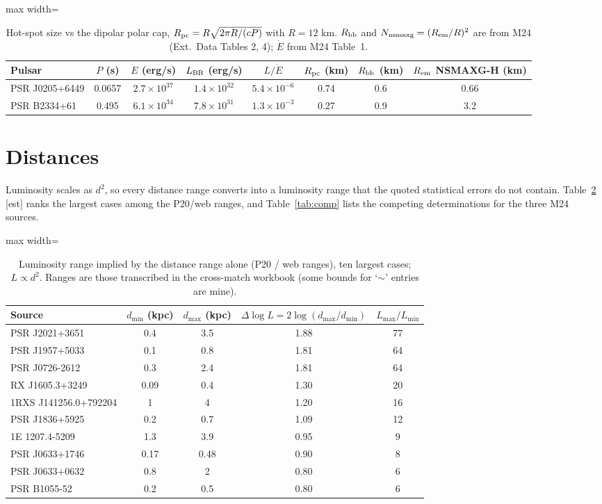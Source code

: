 \documentclass[11pt,a4paper]{article}
\newcommand{\src}[1]{\textsf{[#1]}}
\begin{document}
\begin{table}[htbp]
\centering\small
\caption{Hot-spot size vs the dipolar polar cap, $R_{\rm pc}=R\sqrt{2\pi R/(cP)}$ with $R=12$ km. $R_{\rm bb}$ and $N_{\rm nsmaxg}=(R_{\rm em}/R)^2$ are from M24 (Ext.\ Data Tables 2, 4); $\dot E$ from M24 Table~1.}\label{tab:pc}
\begin{adjustbox}{max width=\textwidth}\begin{tabular}{lccccccc}
\toprule
Pulsar & $P$ (s) & $\dot E$ (erg/s) & $L_{\rm BB}$ (erg/s) & $L/\dot E$ & $R_{\rm pc}$ (km) & $R_{\rm bb}$ (km) & $R_{\rm em}$ NSMAXG-H (km)\\
\midrule
PSR J0205+6449 & 0.0657 & $2.7\times10^{37}$ & $1.4\times10^{32}$ & $5.4\times10^{-6}$ & 0.74 & 0.6 & 0.66\\
PSR B2334+61 & 0.495 & $6.1\times10^{34}$ & $7.8\times10^{31}$ & $1.3\times10^{-3}$ & 0.27 & 0.9 & 3.2\\
\bottomrule
\end{tabular}\end{adjustbox}
\end{table}


\section{Distances}\label{sec:dist}
Luminosity scales as $d^2$, so every distance range converts into a luminosity range that the quoted statistical errors do not contain. Table~\ref{tab:dist} \src{est} ranks the largest cases among the P20/web ranges, and Table~\ref{tab:comp} lists the competing determinations for the three M24 sources.

\begin{table}[htbp]
\centering\small
\caption{Luminosity range implied by the distance range alone (P20 / web ranges), ten largest cases; $L\propto d^2$. Ranges are those transcribed in the cross-match workbook (some bounds for `$\sim$' entries are mine).}\label{tab:dist}
\begin{adjustbox}{max width=\textwidth}\begin{tabular}{lcccc}
\toprule
Source & $d_{\min}$ (kpc) & $d_{\max}$ (kpc) & $\Delta\log L=2\log(d_{\max}/d_{\min})$ & $L_{\max}/L_{\min}$\\
\midrule
PSR J2021+3651 & 0.4 & 3.5 & 1.88 & 77\\
PSR J1957+5033 & 0.1 & 0.8 & 1.81 & 64\\
PSR J0726-2612 & 0.3 & 2.4 & 1.81 & 64\\
RX J1605.3+3249 & 0.09 & 0.4 & 1.30 & 20\\
1RXS J141256.0+792204 & 1 & 4 & 1.20 & 16\\
PSR J1836+5925 & 0.2 & 0.7 & 1.09 & 12\\
1E 1207.4-5209 & 1.3 & 3.9 & 0.95 & 9\\
PSR J0633+1746 & 0.17 & 0.48 & 0.90 & 8\\
PSR J0633+0632 & 0.8 & 2 & 0.80 & 6\\
PSR B1055-52 & 0.2 & 0.5 & 0.80 & 6\\
\bottomrule
\end{tabular}\end{adjustbox}
\end{table}
\end{document}
